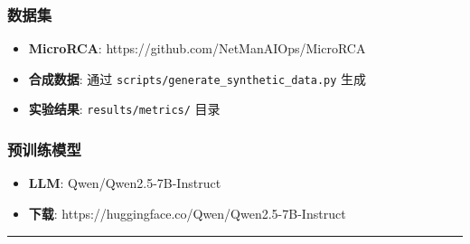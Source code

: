\begin{Shaded}
\begin{Highlighting}[]




\end{Highlighting}
\end{Shaded}

\hypertarget{ux6570ux636eux96c6}{%
\subsubsection{数据集}\label{ux6570ux636eux96c6}}

\begin{itemize}
\tightlist
\item
  \textbf{MicroRCA}: https://github.com/NetManAIOps/MicroRCA
\item
  \textbf{合成数据}: 通过 \texttt{scripts/generate\_synthetic\_data.py}
  生成
\item
  \textbf{实验结果}: \texttt{results/metrics/} 目录
\end{itemize}

\hypertarget{ux9884ux8badux7ec3ux6a21ux578b}{%
\subsubsection{预训练模型}\label{ux9884ux8badux7ec3ux6a21ux578b}}

\begin{itemize}
\tightlist
\item
  \textbf{LLM}: Qwen/Qwen2.5-7B-Instruct
\item
  \textbf{下载}: https://huggingface.co/Qwen/Qwen2.5-7B-Instruct
\end{itemize}

\begin{center}\rule{0.5\linewidth}{0.5pt}\end{center}

